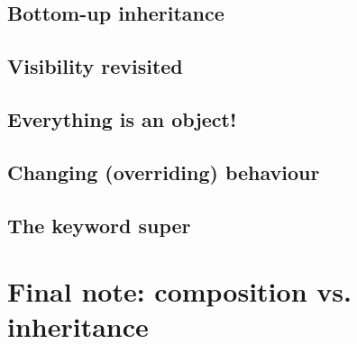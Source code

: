 \subsection{Bottom-up inheritance}
\label{sec:boot-up-inher}


\subsection{Visibility revisited}
\label{sec:protected-keyword}


\subsection{Everything is an object!}
\label{sec:everything-an-object}


\subsection{Changing (overriding) behaviour}
\label{sec:chang-overr-behav}


\subsection{The keyword super}
\label{sec:keyword-super}


\section{Final note: composition vs. inheritance}
\label{sec:final-note:-comp}

